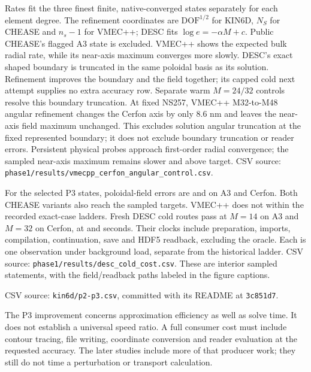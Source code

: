 \documentclass[10pt,a4paper]{article}
\newcommand{\dataref}[1]{{\footnotesize CSV source: \texttt{#1}}}
\begin{document}
Rates fit the three finest finite, native-converged states separately for
each element degree. The refinement coordinates are $\mathrm{DOF}^{1/2}$
for KIN6D, $N_S$ for CHEASE and $n_s-1$ for VMEC++; DESC fits
$\log e=-\alpha M+c$. Public CHEASE's flagged A3 state is excluded.
VMEC++ shows the expected bulk radial rate, while its near-axis maximum
converges more slowly. DESC's exact shaped boundary is truncated in the same
poloidal basis as its solution. Refinement improves the boundary and the field
together; its capped cold next attempt supplies no extra accuracy row.
Separate warm $M=24/32$ controls resolve this boundary truncation.
At fixed NS257, VMEC++ M32-to-M48 angular refinement changes the Cerfon
axis by only 8.6 nm and leaves the near-axis field maximum unchanged.
This excludes solution angular truncation at the fixed represented boundary;
it does not exclude boundary truncation or reader errors. Persistent physical probes approach first-order radial convergence; the
sampled near-axis maximum remains slower and above target.
\dataref{phase1/results/vmecpp\_cerfon\_angular\_control.csv}.

For the selected P3 states, poloidal-field errors are
\PthreeAthreeError{} and \PthreeCerfonError{} on A3 and Cerfon. Both CHEASE
variants also reach the sampled targets. VMEC++ does not within the recorded
exact-case ladders. Fresh DESC cold routes pass at $M=14$ on A3 and $M=32$ on Cerfon,
at \DescColdAthreeTime{} and \DescColdCerfonTime{} seconds. Their clocks
include preparation, imports, compilation, continuation, save and HDF5
readback, excluding the oracle. Each is one observation under background
load, separate from the historical ladder.
\dataref{phase1/results/desc\_cold\_cost.csv}.
These are interior sampled statements, with the field/readback paths labeled
in the figure captions.

\begin{center}\small

\end{center}
\dataref{kin6d/p2-p3.csv}, committed with its README at \texttt{3c851d7}.

The P3 improvement concerns approximation efficiency as well as solve time.
It does not establish a universal speed ratio. A full consumer cost must
include contour tracing, file writing, coordinate conversion and reader
evaluation at the requested accuracy. The later studies include more of that
producer work; they still do not time a perturbation or transport calculation.
\end{document}
